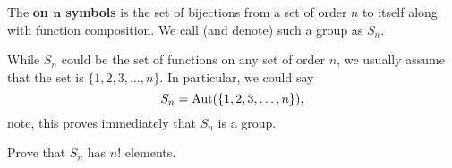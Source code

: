 \documentclass{ximera}
\begin{document}
\begin{definition}
  The  \textbf{on $\boldsymbol{n}$ symbols} is
  the set of bijections from a set of order $n$ to itself along with
  function composition. We call (and denote) such a group as $S_n$.
\end{definition}

\begin{remark}
  While $S_n$ could be the set of functions on any set of order $n$,
  we usually assume that the set is $\{1,2,3,\dots,n\}$. In
  particular, we could say
  \[
  S_n = \operatorname{Aut}(\{1,2,3,\dots,n\}),
  \]
  note, this proves immediately that $S_n$ is a group.
\end{remark}

\begin{exercise}
  Prove that $S_n$ has $n!$ elements.
\end{exercise}
\end{document}
